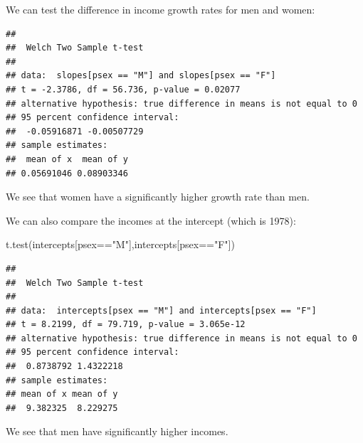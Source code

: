 \documentclass[
  ignorenonframetext,
]{beamer}
\newenvironment{Shaded}{\begin{snugshade}}{\end{snugshade}}
\newcommand{\DecValTok}[1]{\textcolor[rgb]{0.00,0.00,0.81}{#1}}
\newcommand{\FunctionTok}[1]{\textcolor[rgb]{0.00,0.00,0.00}{#1}}
\newcommand{\NormalTok}[1]{#1}
\newcommand{\OtherTok}[1]{\textcolor[rgb]{0.56,0.35,0.01}{#1}}
\newcommand{\SpecialCharTok}[1]{\textcolor[rgb]{0.00,0.00,0.00}{#1}}
\newcommand{\StringTok}[1]{\textcolor[rgb]{0.31,0.60,0.02}{#1}}
\begin{document}
\begin{frame}[fragile]{}
\protect\hypertarget{section-23}{}
We can test the difference in income growth rates for men and women:

\vspace{12pt}
\small

\begin{Shaded}
\end{Shaded}

\begin{verbatim}
## 
##  Welch Two Sample t-test
## 
## data:  slopes[psex == "M"] and slopes[psex == "F"]
## t = -2.3786, df = 56.736, p-value = 0.02077
## alternative hypothesis: true difference in means is not equal to 0
## 95 percent confidence interval:
##  -0.05916871 -0.00507729
## sample estimates:
##  mean of x  mean of y 
## 0.05691046 0.08903346
\end{verbatim}

\vspace{12pt}
\normalsize

We see that women have a significantly higher growth rate than men.
\end{frame}

\begin{frame}[fragile]{}
\protect\hypertarget{section-24}{}
We can also compare the incomes at the intercept (which is 1978):

\vspace{12pt}
\small

\begin{Shaded}
\begin{Highlighting}[]
\FunctionTok{t.test}\NormalTok{(intercepts[psex}\SpecialCharTok{==}\StringTok{"M"}\NormalTok{],intercepts[psex}\SpecialCharTok{==}\StringTok{"F"}\NormalTok{])}
\end{Highlighting}
\end{Shaded}

\begin{verbatim}
## 
##  Welch Two Sample t-test
## 
## data:  intercepts[psex == "M"] and intercepts[psex == "F"]
## t = 8.2199, df = 79.719, p-value = 3.065e-12
## alternative hypothesis: true difference in means is not equal to 0
## 95 percent confidence interval:
##  0.8738792 1.4322218
## sample estimates:
## mean of x mean of y 
##  9.382325  8.229275
\end{verbatim}

\vspace{12pt}
\normalsize

We see that men have significantly higher incomes.
\end{frame}
\end{document}
